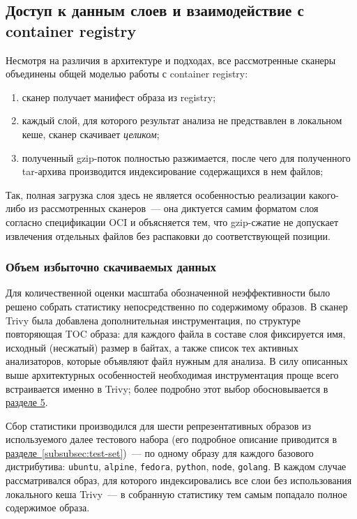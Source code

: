 \subsection{Доступ к данным слоев и взаимодействие с container registry}

Несмотря на различия в архитектуре и подходах, все рассмотренные сканеры объединены общей моделью работы с container registry:

\begin{enumerate}
\item сканер получает манифест образа из registry;
\item каждый слой, для которого результат анализа не предствавлен в локальном кеше, сканер скачивает \textit{целиком};
\item полученный gzip-поток полностью разжимается, после чего для полученного tar-архива производится индексирование содержащихся в нем файлов;
\end{enumerate}

Так, полная загрузка слоя здесь не является особенностью реализации какого-либо из рассмотренных сканеров~--- она диктуется самим форматом слоя согласно спецификации OCI и объясняется тем, что gzip-сжатие не допускает извлечения отдельных файлов без распаковки до соответствующей позиции.

\subsubsection{Объем избыточно скачиваемых данных}
\label{subsubsec:redundant-bytes}

Для количественной оценки масштаба обозначенной неэффективности было решено собрать статистику непосредственно по содержимому образов. В сканер Trivy была добавлена дополнительная инструментация, по структуре повторяющая TOC образа: для каждого файла в составе слоя фиксируется имя, исходный (несжатый) размер в байтах, а также список тех активных анализаторов, которые объявляют файл нужным для анализа. В силу описанных выше архитектурных особенностей необходимая инструментация проще всего встраивается именно в Trivy; более подробно этот выбор обосновывается в \hyperref[sec:Chapter4]{разделе 5}.

Сбор статистики производился для шести репрезентативных образов из используемого далее тестового набора (его подробное описание приводится в \hyperref[subsubsec:test-set]{разделе~\ref{subsubsec:test-set}})~--- по одному образу для каждого базового дистрибутива: \texttt{ubuntu}, \texttt{alpine}, \texttt{fedora}, \texttt{python}, \texttt{node}, \texttt{golang}. В каждом случае рассматривался образ, для которого индексировались все слои без использования локального кеша Trivy~--- в собранную статистику тем самым попадало полное содержимое образа.

